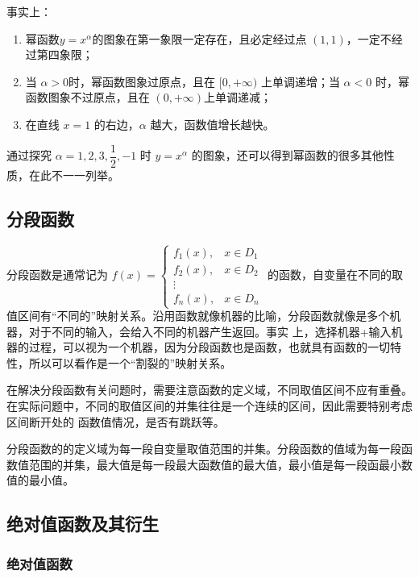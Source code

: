 \documentclass[a4paper,openany]{ctexbook}
\begin{document}
事实上：

\begin{enumerate}
    \item 幂函数\(y=x^\alpha\)的图象在第一象限一定存在，且必定经过点 \((1,1)\)，一定不经过第四象限；
    \item 当 \(\alpha >0\)时，幂函数图象过原点，且在 \([0,+\infty )\) 上单调递增；当 \(\alpha<0\) 时，幂函数图象不过原点，且在 \((0,+\infty )\)上单调递减；
    \item 在直线 \(x=1\) 的右边，\(\alpha\) 越大，函数值增长越快。
\end{enumerate}

通过探究 \(\alpha=1,2,3,\dfrac{1}{2},-1\) 时 \(y=x^\alpha\) 的图象，还可以得到幂函数的很多其他性质，在此不一一列举。

\subsection{分段函数}\label{1db9720b-d3ee-41cf-b2a7-ec5f8e8cd900}

分段函数是通常记为 \(f(x)=\begin{cases}
    f_1(x), & x \in D_1 \\
    f_2(x), & x \in D_2 \\
    \vdots              \\
    f_n(x), & x \in D_n
\end{cases}\) 的函数，自变量在不同的取值区间有“不同的”映射关系。沿用函数就像机器的比喻，分段函数就像是多个机器，对于不同的输入，会给入不同的机器产生返回。事实
上，选择机器+输入机器的过程，可以视为一个机器，因为分段函数也是函数，也就具有函数的一切特性，所以可以看作是一个“割裂的”映射关系。

在解决分段函数有关问题时，需要注意函数的定义域，不同取值区间不应有重叠。在实际问题中，不同的取值区间的并集往往是一个连续的区间，因此需要特别考虑区间断开处的
函数值情况，是否有跳跃等。

分段函数的的定义域为每一段自变量取值范围的并集。分段函数的值域为每一段函数值范围的并集，最大值是每一段最大函数值的最大值，最小值是每一段函最小数值的最小值。

\subsection{绝对值函数及其衍生}

\subsubsection{绝对值函数}
\end{document}
